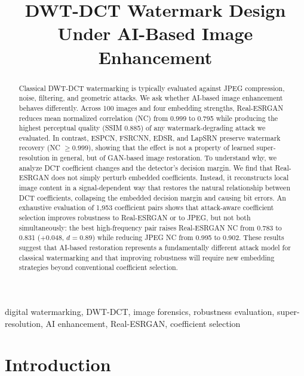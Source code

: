 \documentclass[conference]{IEEEtran}
\begin{document}
\title{DWT-DCT Watermark Design Under AI-Based Image Enhancement}

\author{
}

\maketitle

\begin{abstract}
Classical DWT-DCT watermarking is typically evaluated against JPEG
compression, noise, filtering, and geometric attacks. We ask whether
AI-based image enhancement behaves differently. Across 100 images and
four embedding strengths, Real-ESRGAN reduces mean normalized
correlation (NC) from 0.999 to 0.795 while producing the highest
perceptual quality (SSIM 0.885) of any watermark-degrading attack we
evaluated. In contrast, ESPCN, FSRCNN, EDSR, and LapSRN preserve watermark
recovery (NC $\geq 0.999$), showing that the effect is not a property
of learned super-resolution in general, but of GAN-based image
restoration. To understand why, we analyze DCT coefficient changes and
the detector's decision margin. We find that Real-ESRGAN does not
simply perturb embedded coefficients. Instead, it reconstructs local
image content in a signal-dependent way that restores the natural
relationship between DCT coefficients, collapsing the embedded decision
margin and causing bit errors. An exhaustive evaluation of 1,953
coefficient pairs shows that attack-aware coefficient selection
improves robustness to Real-ESRGAN or to JPEG, but not both
simultaneously: the best high-frequency pair raises Real-ESRGAN NC
from 0.783 to 0.831 ($+0.048$, $d=0.89$) while reducing JPEG NC from
0.995 to 0.902. These results suggest that AI-based restoration
represents a fundamentally different attack model for classical
watermarking and that improving robustness will require new embedding
strategies beyond conventional coefficient selection.
\end{abstract}

\begin{IEEEkeywords}
digital watermarking, DWT-DCT, image forensics, robustness evaluation,
super-resolution, AI enhancement, Real-ESRGAN, coefficient selection
\end{IEEEkeywords}

\section{Introduction}
\label{sec:intro}
\end{document}
